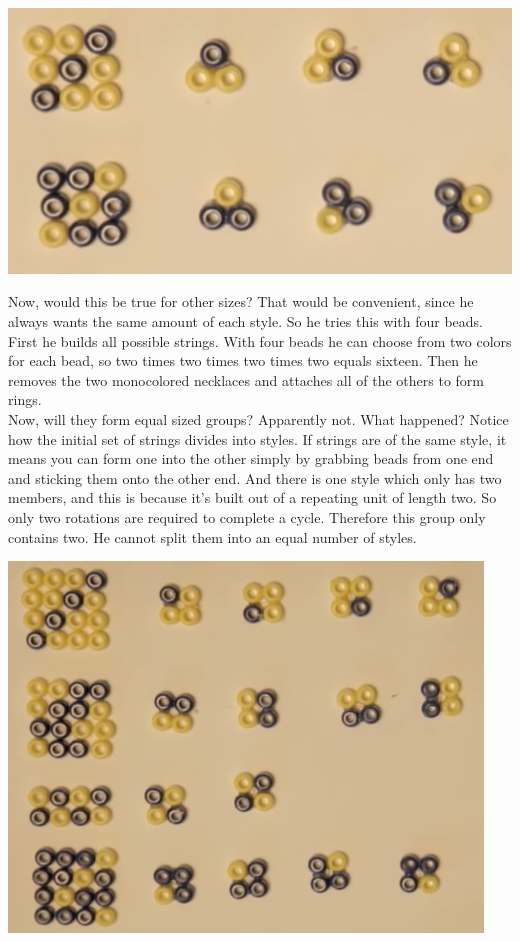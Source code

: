 \documentclass{report}
\begin{document}
 \begin{center}
	\includegraphics[scale=1]{85.png}
\end{center}
Now, would this be true for other sizes? That would be convenient, since he always wants the same amount of each style. So he tries this with four beads. First he builds all possible strings. With four beads he can choose from two colors for each bead, so two times two times two times two equals sixteen. Then he removes the two monocolored necklaces and attaches all of the others to form rings.\\
Now, will they form equal sized groups? Apparently not. What happened? Notice how the initial set of strings divides into styles. If strings are of the same style, it means you can form one into the other simply by grabbing beads from one end and sticking them onto the other end. And there is one style which only has two members, and this is because it's built out of a repeating unit of length two. So only two rotations are required to complete a cycle. Therefore this group only contains two. He cannot split them into an equal number of styles.
 \begin{center}
	\includegraphics[scale=1]{86.png}
\end{center}
\end{document}
